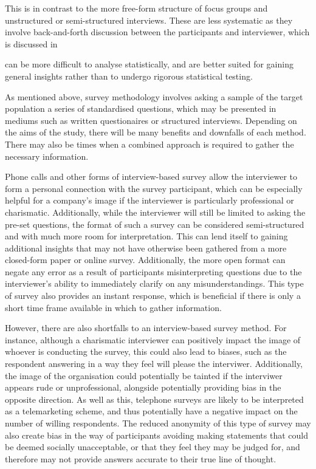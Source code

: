 This is in contrast to the more free-form structure of focus groups and unstructured or semi-structured interviews. These are less systematic as they 
involve back-and-forth discussion between the participants and interviewer, which is discussed in 

can be more difficult to 
analyse statistically, and are better suited for gaining 
general insights rather than to undergo rigorous statistical testing. 


As mentioned above, survey methodology involves asking a sample of the target population a series of standardised questions, 
which may be presented in mediums such as written questionaires or structured interviews. Depending on the aims of the study, there
will be many benefits and downfalls of each method. There may also be times when a combined approach is required to
gather the necessary information.

Phone calls and other forms of interview-based survey allow the interviewer to form a personal connection with 
the survey participant, which can be especially helpful for a company's image if the interviewer is particularly professional 
or charismatic. Additionally, while the interviewer will still be limited to asking the pre-set questions, the format of such a survey can 
be considered semi-structured and with much more room for interpretation. This can lend itself to gaining additional insights
that may not have otherwise been gathered from a more closed-form paper or online survey. Additionally, the more open format
can negate any error as a result of participants misinterpreting questions due to the interviewer's ability to immediately 
clarify on any misunderstandings. This type of survey also provides an instant response, which is beneficial if there is only 
a short time frame available in which to gather information. 

However, there are also shortfalls to an interview-based survey method. For instance, although a charismatic interviewer can 
positively impact the image of whoever is conducting the survey, this could also lead to biases, such as the respondent 
answering in a way they feel will please the interviwer.
Additionally, the image of the organisation could potentially be tainted if the interviwer appears rude or unprofessional, 
alongside potentially providing bias in the opposite direction. As well as this, telephone surveys are likely to be 
interpreted as a telemarketing scheme, and thus potentially have a negative impact on the number of willing respondents.
The reduced anonymity of this type of survey may also create bias in the way of participants avoiding making statements
that could be deemed socially unacceptable, or that they feel they may be judged for, and therefore may not provide answers
accurate to their true line of thought.

